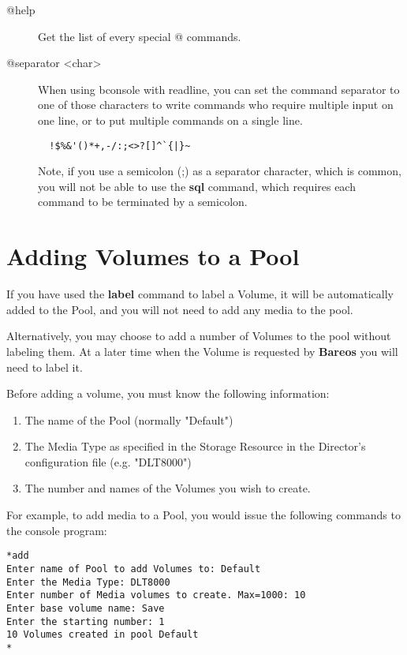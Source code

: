 \begin{description}
\item [@help]
   Get the list of every special @ commands.

\item [@separator {\textless}char{\textgreater}]
  When using bconsole with readline, you can set the command separator to one
  of those characters to write commands who require multiple input on one line,
  or to put multiple commands on a single line.
\begin{verbatim}
  !$%&'()*+,-/:;<>?[]^`{|}~
\end{verbatim}

  Note, if you use a semicolon (;) as a separator character, which is
  common, you will not be able to use the {\bf sql} command, which
  requires each command to be terminated by a semicolon.

\end{description}


\section{Adding Volumes to a Pool}


If you have used the {\bf label} command to label a Volume, it will be
automatically added to the Pool, and you will not need to add any media to the
pool.

Alternatively, you may choose to add a number of Volumes to the pool without
labeling them. At a later time when the Volume is requested by {\bf Bareos}
you will need to label it.

Before adding a volume, you must know the following information:

\begin{enumerate}
\item The name of the Pool (normally "Default")
\item The Media Type as specified in the Storage Resource  in the Director's
   configuration file (e.g. "DLT8000")
\item The number and names of the Volumes you wish to create.
\end{enumerate}

For example, to add media to a Pool, you would issue the following commands to
the console program:

\footnotesize
\begin{verbatim}
*add
Enter name of Pool to add Volumes to: Default
Enter the Media Type: DLT8000
Enter number of Media volumes to create. Max=1000: 10
Enter base volume name: Save
Enter the starting number: 1
10 Volumes created in pool Default
*
\end{verbatim}
\normalsize

